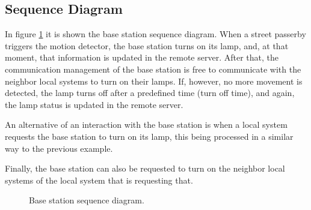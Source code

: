 \clearpage
%
%
%
%

\clearpage
\subsection{Sequence Diagram}
In figure \ref{fig:bs_seq_diagram} it is shown the base station sequence diagram. When a street passerby triggers the motion detector, the base station turns on its lamp, and, at that moment, that information is updated in the remote server. After that, the communication management of the base station is free to communicate with the neighbor local systems to turn on their lamps. If, however, no more movement is detected, the lamp turns off after a predefined time (turn off time), and again, the lamp status is updated in the remote server.

An alternative of an interaction with the base station is when a local system requests the base station to turn on its lamp, this being processed in a similar way to the previous example.

Finally, the base station can also be requested to turn on the neighbor local systems of the local system that is requesting that.
\begin{figure}[ht]
	\centering
	\caption{Base station sequence diagram.}
	\label{fig:bs_seq_diagram}
\end{figure}